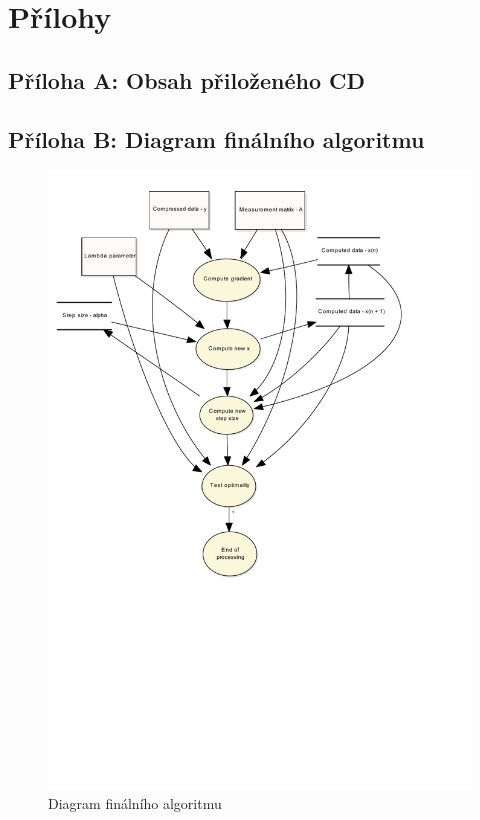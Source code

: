 \documentclass[FM,BP]{tulthesis}
\begin{document}
\chapter*{Přílohy}
\begin{appendices}
	\section*{Příloha A: Obsah přiloženého CD}
	\label{appA}
	\newpage
	\section*{Příloha B: Diagram finálního algoritmu} \label{appB}
	\begin{figure}[!ht]
		\begin{center}
			\includegraphics[scale=0.8]{obr/finalAlg.pdf}
		\end{center}
		\caption{Diagram finálního algoritmu}
		\label{fig:finalAlg}
	\end{figure}
\end{appendices}
\end{document}
